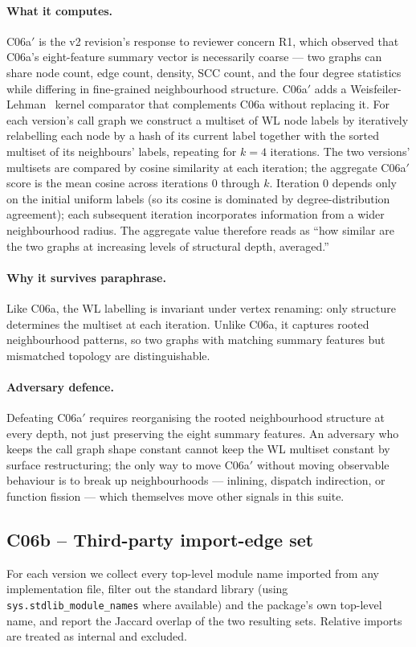 \documentclass[11pt,letterpaper]{article}
\begin{document}
\paragraph{What it computes.} C06a$'$ is the v2 revision's response to
reviewer concern R1, which observed that C06a's eight-feature summary
vector is necessarily coarse --- two graphs can share node count, edge
count, density, SCC count, and the four degree statistics while
differing in fine-grained neighbourhood structure. C06a$'$ adds a
Weisfeiler-Lehman~\cite{shervashidze2011weisfeiler} kernel comparator
that complements C06a without replacing it. For each version's call
graph we construct a multiset of WL node labels by iteratively
relabelling each node by a hash of its current label together with
the sorted multiset of its neighbours' labels, repeating for $k=4$
iterations. The two versions' multisets are compared by cosine
similarity at each iteration; the aggregate C06a$'$ score is the
mean cosine across iterations $0$ through $k$. Iteration $0$ depends
only on the initial uniform labels (so its cosine is dominated by
degree-distribution agreement); each subsequent iteration incorporates
information from a wider neighbourhood radius. The aggregate value
therefore reads as ``how similar are the two graphs at increasing
levels of structural depth, averaged.''

\paragraph{Why it survives paraphrase.} Like C06a, the WL labelling
is invariant under vertex renaming: only structure determines the
multiset at each iteration. Unlike C06a, it captures rooted
neighbourhood patterns, so two graphs with matching summary
features but mismatched topology are distinguishable.

\paragraph{Adversary defence.} Defeating C06a$'$ requires reorganising
the rooted neighbourhood structure at every depth, not just preserving
the eight summary features. An adversary who keeps the call graph
shape constant cannot keep the WL multiset constant by surface
restructuring; the only way to move C06a$'$ without moving observable
behaviour is to break up neighbourhoods --- inlining, dispatch
indirection, or function fission --- which themselves move other
signals in this suite.

\subsection{C06b -- Third-party import-edge set}
\label{sec:c06b}
For each version we collect every top-level module name imported
from any implementation file, filter out the standard library (using
\texttt{sys.stdlib\_module\_names} where available) and the package's
own top-level name, and report the Jaccard overlap of the two
resulting sets. Relative imports are treated as internal and
excluded.
\end{document}
